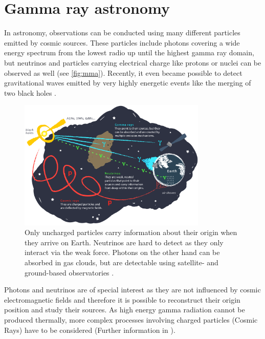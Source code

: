 \chapter{Gamma ray astronomy}
In astronomy, observations can be conducted using many different particles emitted by cosmic sources. 
These particles include photons covering a wide energy spectrum from the lowest radio up until the highest gamma ray domain,
but neutrinos and particles carrying electrical charge like protons or nuclei can be observed as well (see \autoref{fig:mma}). 
Recently, it even became possible to detect gravitational waves emitted by very highly energetic events like the merging of two black holes \cite{PhysRevLett.116.061102}.
\begin{figure}
    \centering
    \includegraphics[width=0.8\textwidth]{images/cosmic_messengers.png}
    \caption{Only uncharged particles carry information about their origin when they arrive on Earth.
        Neutrinos are hard to detect as they only interact via the weak force.
        Photons on the other hand can be absorbed in gas clouds, but are detectable using satellite- and ground-based observatories \cite{mma_icecube}.
    }
    \label{fig:mma}
\end{figure}

Photons and neutrinos are of special interest as they are not influenced by cosmic electromagnetic fields and therefore it is possible to reconstruct their origin 
position and study their sources.
As high energy gamma radiation cannot be produced thermally, more complex processes involving charged particles (Cosmic Rays) have to be considered 
(Further information in \cite{s_funk}).


